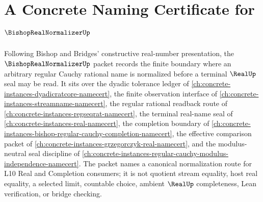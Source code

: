 \chapter{A Concrete Naming Certificate for $\BishopRealNormalizerUp$}
\label{ch:concrete-instances-bishop-real-normalizer-namecert}

Following Bishop and Bridges' constructive real-number presentation, the $\BishopRealNormalizerUp$ packet records the finite boundary where an arbitrary regular Cauchy rational name is normalized before a terminal $\RealUp$ seal may be read. It sits over the dyadic tolerance ledger of \autoref{ch:concrete-instances-dyadicratcore-namecert}, the finite observation interface of \autoref{ch:concrete-instances-streamname-namecert}, the regular rational readback route of \autoref{ch:concrete-instances-regseqrat-namecert}, the terminal real-name seal of \autoref{ch:concrete-instances-real-namecert}, the completion boundary of \autoref{ch:concrete-instances-bishop-regular-cauchy-completion-namecert}, the effective comparison packet of \autoref{ch:concrete-instances-grzegorczyk-real-namecert}, and the modulus-neutral seal discipline of \autoref{ch:concrete-instances-regular-cauchy-modulus-independence-namecert}. The packet names a canonical normalization route for L10 Real and Completion consumers; it is not quotient stream equality, host real equality, a selected limit, countable choice, ambient $\RealUp$ completeness, Lean verification, or bridge checking.

